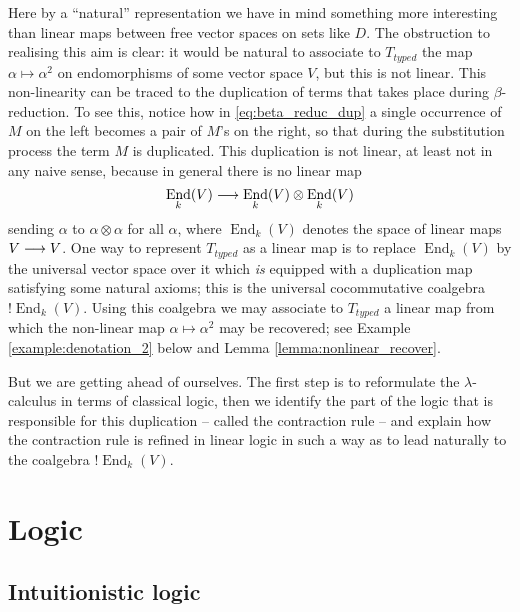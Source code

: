 \documentclass[english,letter paper,12pt,reqno]{article}
\theoremstyle{example}
\numberwithin{equation}{section}
\DeclareMathOperator{\End}{End}
\begin{document}
Here by a ``natural'' representation we have in mind something more interesting than linear maps between free vector spaces on sets like $D$. The obstruction to realising this aim is clear: it would be natural to associate to $T_{typed}$ the map $\alpha \mapsto \alpha^2$ on endomorphisms of some vector space $V$, but this is not linear. This non-linearity can be traced to the duplication of terms that takes place during $\beta$-reduction. To see this, notice how in \eqref{eq:beta_reduc_dup} a single occurrence of $M$ on the left becomes a pair of $M$'s on the right, so that during the substitution process the term $M$ is duplicated. This duplication is not linear, at least not in any naive sense, because in general there is no linear map
\begin{equation}\label{eq:dup_map_end}
\End_k(V) \lto \End_k(V) \otimes \End_k(V)
\end{equation}
sending $\alpha$ to $\alpha \otimes \alpha$ for all $\alpha$, where $\End_k(V)$ denotes the space of linear maps $V \longrightarrow V$. One way to represent $T_{typed}$ as a linear map is to replace $\End_k(V)$ by the universal vector space over it which \emph{is} equipped with a duplication map satisfying some natural axioms; this is the universal cocommutative coalgebra ${!} \End_k(V)$. Using this coalgebra we may associate to $T_{typed}$ a linear map from which the non-linear map $\alpha \mapsto \alpha^2$ may be recovered; see Example \ref{example:denotation_2} below and Lemma \ref{lemma:nonlinear_recover}. %

But we are getting ahead of ourselves. The first step is to reformulate the $\lambda$-calculus in terms of classical logic, then we identify the part of the logic that is responsible for this duplication -- called the contraction rule -- and explain how the contraction rule is refined in linear logic in such a way as to lead naturally to the coalgebra ${!} \End_k(V)$.

\section{Logic}

\subsection{Intuitionistic logic}\label{section:intuit_logic}
\end{document}
